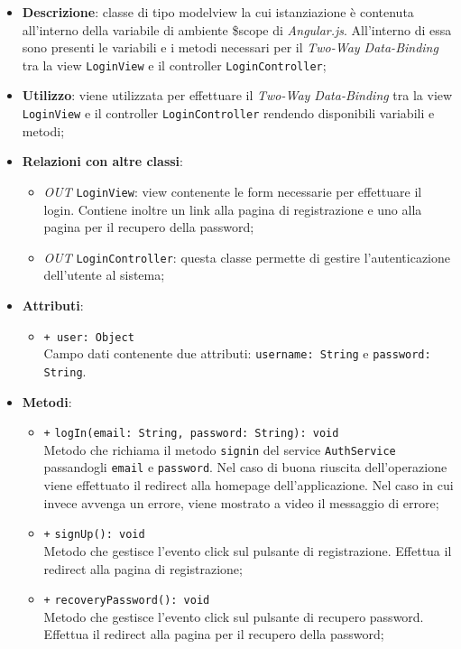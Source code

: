 	\begin{itemize}
		\item \textbf{Descrizione}: classe di tipo modelview la cui istanziazione è contenuta all'interno della variabile di ambiente \$scope di \textit{Angular.js}. All'interno di essa sono presenti le variabili e i metodi necessari per il \textit{Two-Way Data-Binding} tra la view \texttt{LoginView} e il controller \texttt{LoginController};
		\item \textbf{Utilizzo}: viene utilizzata per effettuare il \textit{Two-Way Data-Binding} tra la view \texttt{LoginView} e il controller \texttt{LoginController} rendendo disponibili variabili e metodi;
		\item \textbf{Relazioni con altre classi}: 
		\begin{itemize}
			\item \textit{OUT} \texttt{LoginView}: view contenente le form necessarie per effettuare il login. Contiene inoltre un link alla pagina di registrazione e uno alla pagina per il recupero della password; 
			\item \textit{OUT} \texttt{LoginController}: questa classe permette di gestire l'autenticazione dell'utente al sistema;
		\end{itemize}
		\item \textbf{Attributi}: 
		\begin{itemize}
				\item \texttt{+ user: Object} \\ Campo dati contenente due attributi: \texttt{username: String} e \texttt{password: String}.
		\end{itemize}
		\item \textbf{Metodi}: 
		\begin{itemize}
			\item \texttt{+} \texttt{logIn(email: String, password: String): void} \\
			Metodo che richiama il metodo \texttt{signin} del service \texttt{AuthService} passandogli \texttt{email} e \texttt{password}. Nel caso di buona riuscita dell'operazione viene effettuato il redirect alla homepage dell'applicazione. Nel caso in cui invece avvenga un errore, viene mostrato a video il messaggio di errore;
			\item \texttt{+} \texttt{signUp(): void} \\
			Metodo che gestisce l’evento click sul pulsante di registrazione. Effettua il redirect alla pagina di registrazione;
			\item \texttt{+} \texttt{recoveryPassword(): void} \\
			Metodo che gestisce l’evento click sul pulsante di recupero password. Effettua il redirect alla pagina per il recupero della password; 
		\end{itemize}
	\end{itemize}
	
	